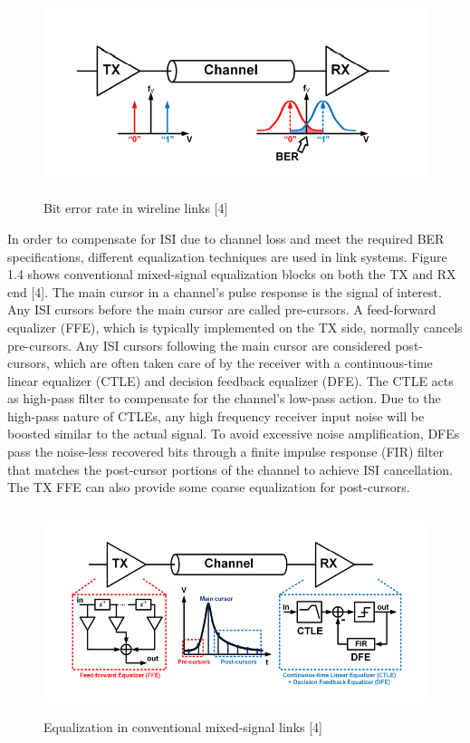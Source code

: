 \begin{figure}
	\centering
	\includegraphics[width=12cm,height=6cm]{fig1_3.png}
	\caption{Bit error rate in wireline links [4]}
	\label{BER_links}
\end{figure}

In order to compensate for ISI due to channel loss and meet the required BER specifications, different equalization techniques are used in link systems. Figure 1.4 shows conventional mixed-signal equalization blocks on both the TX and RX end [4]. The main cursor in a channel's pulse response is the signal of interest. Any ISI cursors before the main cursor are called pre-cursors. A feed-forward equalizer (FFE), which is typically implemented on the TX side, normally cancels pre-cursors. Any ISI cursors following the main cursor are considered post-cursors, which are often taken care of by the receiver with a continuous-time linear equalizer (CTLE) and decision feedback equalizer (DFE). The CTLE acts as high-pass filter to compensate for the channel's low-pass action. Due to the high-pass nature of CTLEs, any high frequency receiver input noise will be boosted similar to the actual signal. To avoid excessive noise amplification, DFEs pass the noise-less recovered bits through a finite impulse response (FIR) filter that matches the post-cursor portions of the channel to achieve ISI cancellation. The TX FFE can also provide some coarse equalization for post-cursors.

\begin{figure}
	\centering
	\includegraphics[width=12cm,height=6cm]{fig1_4.png}
	\caption{Equalization in conventional mixed-signal links [4]}
	\label{BER_links}
\end{figure}


